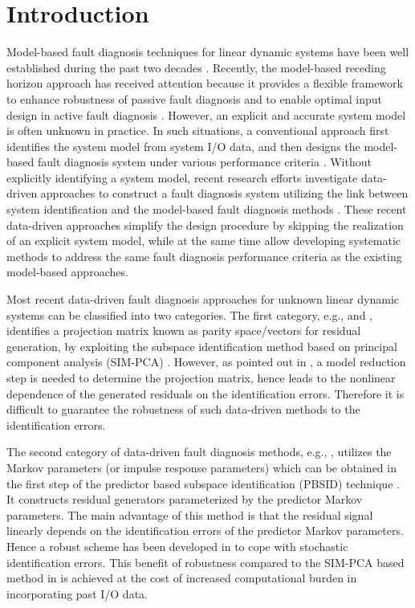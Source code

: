 \documentclass[twocolumn]{autart}
\begin{document}
\section{Introduction}
Model-based fault diagnosis techniques for linear dynamic systems have been well established during the past two decades \cite{Blanke2006, ChenPatton1999, Ding2013book, Gust2001}. Recently, the model-based receding horizon approach has received attention because it provides a flexible framework to  enhance robustness of passive fault diagnosis \cite{Wan2013, Zhang2014} and to enable optimal input design in active fault diagnosis \cite{Raim2013a, Raim2013b, Siman2005}. However, an explicit and accurate system model is often unknown in practice. In such situations, a conventional approach first identifies the system model from system I/O data, and then designs the model-based fault diagnosis system under various performance criteria \cite{Simani2003, Patward2005, Manuja2009}. Without explicitly identifying a system model, recent research efforts investigate data-driven approaches to construct a fault diagnosis system utilizing the link between system identification and the model-based fault diagnosis methods \cite{Russell2000, Ding2014book, Ding2014JPC}. These recent data-driven approaches simplify the design procedure by skipping the realization of an explicit system model, while at the same time allow developing systematic methods to address the same fault diagnosis performance criteria as the existing model-based approaches.


Most recent data-driven fault diagnosis approaches for unknown linear dynamic systems can be classified into two categories. The first category, e.g., \cite{QinLi2001} and \cite{Ding2009JPC, Ding2014JPC}, identifies a projection matrix known as parity space/vectors for residual generation, by exploiting the subspace identification method based on principal component analysis (SIM-PCA) \cite{HuangDing2005}.
However, as pointed out in \cite{Dong2012a}, a model reduction step is needed to determine the projection matrix, hence leads to the nonlinear dependence of the generated residuals on the identification errors. Therefore it is difficult to guarantee the robustness of such data-driven methods to the identification errors.


The second category of data-driven fault diagnosis methods, e.g., \cite{Dong2009thesis}, utilizes the Markov parameters (or impulse response parameters) which can be obtained in the first step of the predictor based subspace identification (PBSID) technique \cite{Chiuso2007a, Veen2012}. It constructs residual generators parameterized by the predictor Markov parameters. The main advantage of this method is that the residual signal linearly depends on the identification errors of the predictor Markov parameters. Hence a robust scheme has been developed in \cite{Dong2012a, Dong2012b} to cope with stochastic identification errors. This benefit of robustness compared to the SIM-PCA based method in \cite{Ding2009JPC} is achieved at the cost of increased computational burden in incorporating past I/O data.
\end{document}

